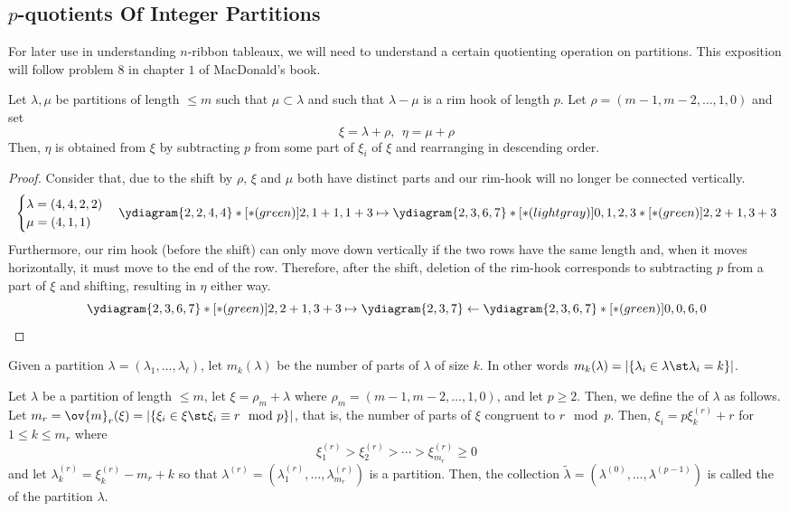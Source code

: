 \documentclass[11pt,leqno,oneside]{amsart}
\numberwithin{thm}{section}
\newcommand{\rowshift}{\rho}
\begin{document}
\subsection{\(p\)-quotients Of Integer Partitions}
For later use in understanding \(n\)-ribbon tableaux, we will need to
understand a certain quotienting operation on partitions. This
exposition will follow problem \(8\) in chapter \(1\) of MacDonald's
book.
\begin{prop}
  Let \(\lambda, \mu\) be partitions of length \(\leq m\) such that
  \(\mu \subset \lambda\) and such that \(\lambda-\mu\) is a rim
  hook of length \(p\). Let \(\rowshift = (m-1, m-2, \ldots, 1,0)\) and set \[
    \xi = \lambda + \rowshift, \ \ \eta = \mu + \rowshift
  \]
  Then, \(\eta\) is obtained from \(\xi\) by subtracting \(p\) from
  some part of \(\xi_i\) of \(\xi\) and rearranging in descending order.
\end{prop}
\begin{proof}
  Consider that, due to the shift by \(\rowshift\), \(\xi\) and
  \(\mu\) both have distinct parts and our rim-hook will no longer be
  connected vertically. \[
    \begin{cases}
      \lambda = (4,4,2,2)\\
      \mu = (4,1,1)
    \end{cases}
    \ydiagram{2,2,4,4}*[*(green)]{2,1+1,1+3} \mapsto
    \ydiagram{2,3,6,7}*[*(lightgray)]{0,1,2,3}*[*(green)]{2,2+1,3+3} 
  \]
  Furthermore, our rim hook (before the shift) can only move down vertically if the two
  rows have the same length and, when it moves horizontally, it must
  move to the end of the row. Therefore, after the shift, deletion
  of the rim-hook corresponds to subtracting \(p\) from a part of
  \(\xi\) and shifting, resulting in \(\eta\) either way. \[
    \ydiagram{2,3,6,7}*[*(green)]{2,2+1,3+3}
    \mapsto \ydiagram{2,3,7} \leftarrow \ydiagram{2,3,6,7}*[*(green)]{0,0,6,0}
  \]
\end{proof}
\begin{defn}
  Given a partition \(\lambda = (\lambda_1, \ldots, \lambda_\ell)\),
  let \(m_k(\lambda)\) be the number of parts of \(\lambda\) of size
  \(k\). In other words \(m_k(\lambda) = |\{\lambda_i \in \lambda \st \lambda_i =
  k\}|\).
\end{defn}
\begin{defn}
  Let \(\lambda\) be a partition of length \(\leq m\), let \(\xi =
  \rowshift_m + \lambda\) where \(\rowshift_m = (m-1, m-2, \ldots, 1,
  0)\), and let \(p \geq 2\). Then, we define the 
  of \(\lambda\) as follows. \\

  Let \(m_r = \ov{m}_r(\xi) = |\{\xi_i \in \xi \st \xi_i \equiv r \mod
  p\}|\), that is, the number of parts of \(\xi\) congruent to \(r
  \mod p\). Then, \(\xi_i = p \xi_k^{(r)}+r\) for \(1 \leq k \leq
  m_r\) where \[
    \xi_1^{(r)} > \xi_2^{(r)} > \cdots > \xi_{m_r}^{(r)} \geq 0
  \]
  and let \(\lambda_k^{(r)} = \xi_k^{(r)}-m_r+k\) so that
  \(\lambda^{(r)} = (\lambda_1^{(r)}, \ldots, \lambda_{m_r}^{(r)})\)
  is a partition. Then, the collection \(\tilde{\lambda} =
  (\lambda^{(0)}, \ldots, \lambda^{(p-1)})\) is called the
   of the partition \(\lambda\).
\end{defn}
\end{document}
